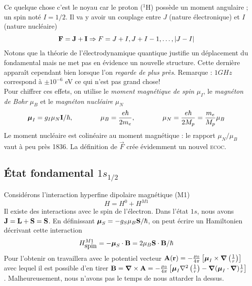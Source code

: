 Ce quelque chose c'est le noyau car le proton ($^1$H) possède un moment angulaire ; un spin noté
$I=1/2$. Il va y avoir un couplage entre $J$ (nature électronique) et $I$ (nature nucléaire)
\begin{equation}
{\bf F} = {\bf J} + {\bf I} \Rightarrow 
F = J+I, J+I-1, \ldots, \vert J-I \vert
\end{equation}
Notons que la théorie de l'électrodynamique quantique justifie un déplacement du fondamental mais
ne met pas en évidence un nouvelle structure. Cette dernière apparaît cependant bien lorsque
l'on \textit{regarde de plus près}. Remarque : $1GHz$ correspond à $\pm 10^{-6}$ eV ce qui n'est 
pas grand chose!\\

Pour chiffrer ces effets, on utilise le \textit{moment magnétique de spin $\mu_I$}, le 
\textit{magnéton de Bohr} $\mu_B$ et le \textit{magnéton nucléaire} $\mu_N$
\begin{equation}
\mbox{\boldmath $ \mu $}_I = g_I \mu_N {\bf I}/ \hbar,\qquad\qquad
\mu_B = \frac{e \hbar}{2m_e},\qquad\qquad
\mu_N = \frac{e \hbar}{2M_p} = \frac{m_e}{M_p} \mu_B
\end{equation}
Le moment nucléaire est colinéaire au moment magnétique : le rapport $\mu_N/\mu_B$ vaut à peu près
1836. La définition de $\vec F$ crée évidemment un nouvel \textsc{ecoc}.

\subsection{État fondamental $1s_{1/2}$}
Considérons l'interaction hyperfine dipolaire magnétique (M1)
\begin{equation}
H = H^0 + H^{M1}
\end{equation}
Il existe des interactions avec le spin de l'électron. Dans l'état $1s$, nous avons 
${\bf J} = {\bf L} + {\bf S} = {\bf S}$. En définissant $\mbox{\boldmath $ \mu $}_S = -g_S \mu_B {\bf
S}/ \hbar$, on peut écrire un Hamiltonien décrivant cette interaction
\begin{equation}
H^{M1}_{\mbox{spin}} = - \mbox{\boldmath $ \mu $}_S \cdot 
{\bf B} = 2 \mu_B {\bf S} \cdot {\bf B} / \hbar
\end{equation}
Pour l'obtenir on travaillera avec le potentiel vecteur ${\bf A} ({\bf r}) = - \frac{\mu_0}{4 \pi}
\left[ \mbox{\boldmath $ \mu $}_I \times \mbox{\boldmath $ \nabla $} \left( \frac{1}{r} \right)
\right]$ avec lequel il est possible d'en tirer ${\bf B} = \mbox{\boldmath $ \nabla $} \times {\bf A}
= -\frac{\mu_0}{4 \pi} \left[\mbox{\boldmath $ \mu $}_I \nabla^2 \left( \frac{1}{r}  \right)
 - \mbox{\boldmath $ \nabla $} ( \mbox{\boldmath $ \mu $}_I \cdot \mbox{\boldmath $ \nabla $} )
\frac{1}{r} \right]$. Malheureusement, nous n'avons pas le temps de nous attarder la dessus.\\

